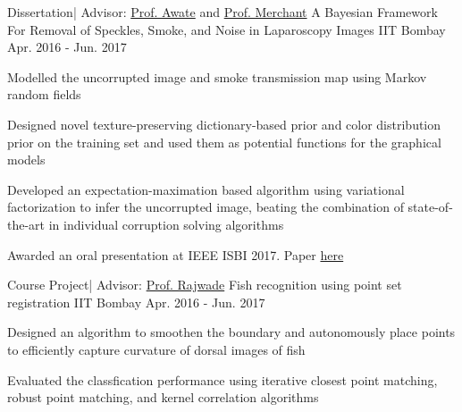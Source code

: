 

\begin{cventries}

  \cventry
    {Dissertation| Advisor: { \color{awesome} \href{https://www.cse.iitb.ac.in/~suyash/}{Prof. Awate} } and { \color{awesome} \href{https://www.ee.iitb.ac.in/wiki/faculty/merchant}{Prof. Merchant} } } %
    {A Bayesian Framework For Removal of Speckles, Smoke, and Noise in Laparoscopy Images} %
    {IIT Bombay} %
    {Apr. 2016 - Jun. 2017} %
    {
      \begin{cvitems} %
        \item {Modelled the uncorrupted image and smoke transmission map using Markov random fields}
        \item {Designed novel texture-preserving dictionary-based prior and color distribution prior on the training set and used them as potential functions for the graphical models}
        \item {Developed an expectation-maximation based algorithm using variational factorization to infer the uncorrupted image, beating the combination of state-of-the-art in individual corruption solving algorithms}
        \item {Awarded an oral presentation at IEEE ISBI 2017. Paper { \color{awesome} \href{https://ieeexplore.ieee.org/abstract/document/7950623}{here} } }
      \end{cvitems}
    }

	\cventry
	{Course Project| Advisor: { \color{awesome} \href{https://www.cse.iitb.ac.in/~ajitvr/}{Prof. Rajwade} } } %
	{Fish recognition using point set registration} %
	{IIT Bombay} %
	{Apr. 2016 - Jun. 2017} %
	{
		\begin{cvitems} %
			\item {Designed an algorithm to smoothen the boundary and autonomously place points to efficiently capture curvature of dorsal images of fish}
			\item {Evaluated the classfication performance using iterative closest point matching, robust point matching, and kernel correlation algorithms}
		\end{cvitems}
	}

\end{cventries}
